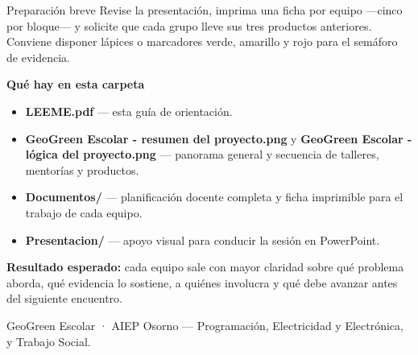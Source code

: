 \documentclass[9pt,a4paper]{article}
\begin{document}
\begin{softbox}{Preparación breve}
Revise la presentación, imprima una ficha por equipo —cinco por bloque— y solicite que cada grupo lleve sus tres productos anteriores. Conviene disponer lápices o marcadores verde, amarillo y rojo para el semáforo de evidencia.
\end{softbox}

{\bfseries\color{AIEPNavy}Qué hay en esta carpeta}\par
\begin{itemize}
  \item \textbf{LEEME.pdf} — esta guía de orientación.
  \item \textbf{GeoGreen Escolar - resumen del proyecto.png} y \textbf{GeoGreen Escolar - lógica del proyecto.png} — panorama general y secuencia de talleres, mentorías y productos.
  \item \textbf{Documentos/} — planificación docente completa y ficha imprimible para el trabajo de cada equipo.
  \item \textbf{Presentacion/} — apoyo visual para conducir la sesión en PowerPoint.
\end{itemize}

\begin{tcolorbox}[colback=AIEPNavy,colframe=AIEPNavy,coltext=white,boxrule=0pt,arc=1mm,left=3mm,right=3mm,top=1.8mm,bottom=1.8mm,before skip=3pt]
\textbf{Resultado esperado:} cada equipo sale con mayor claridad sobre qué problema aborda, qué evidencia lo sostiene, a quiénes involucra y qué debe avanzar antes del siguiente encuentro.
\end{tcolorbox}

\vfill
{\footnotesize\color{AIEPMuted}GeoGreen Escolar · AIEP Osorno — Programación, Electricidad y Electrónica, y Trabajo Social.}
\end{document}
